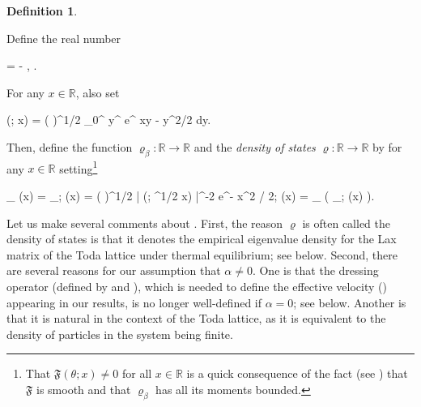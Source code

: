 \documentclass{amsart}
\numberwithin{equation}{section}
\theoremstyle{remark}
\theoremstyle{definition}
\newtheorem{definition}[thm]{Definition}
\begin{document}
	\begin{definition}
		
		\label{frho} 
		
		Define the real number
		\begin{flalign}
			\label{alpha} 
			\alpha =  \log \beta - \displaystyle{}, \qquad {}.
		\end{flalign} 

		\noindent For any $x \in \mathbb{R}$, also set   
		\begin{flalign*} 
			 (\theta; x) = \bigg( \displaystyle\frac{\theta}{\Gamma(\theta)} \bigg)^{1/2} \displaystyle\int_0^{\infty} y^{} e^{ xy - y^2/2} dy.
		\end{flalign*}
		
		\noindent Then, define the function $\varrho_{\beta} : \mathbb{R} \rightarrow \mathbb{R}$ and the \emph{density of states} $\varrho : \mathbb{R} \rightarrow \mathbb{R}$ by for any $x \in \mathbb{R}$ setting\footnote{That $\mathfrak{F}(\theta;x) \ne 0$ for all $x \in \mathbb{R}$ is a quick consequence of the fact (see \cite[Section 3.3]{SMRME}) that $\mathfrak{F}$ is smooth and that $\varrho_{\beta}$ has all its moments bounded.}
		\begin{flalign*}
			\varrho_{\beta} (x) = \varrho_{\beta; \theta} (x) = \Big( \displaystyle\frac{\beta}{2\pi} \Big)^{1/2} \cdot |  (\theta; \beta^{1/2} x) |^{-2} \cdot e^{- \beta x^2 / 2}; \qquad \varrho (x) = \partial_{\theta} \big( \theta \cdot \varrho_{\beta; \theta} (x) \big).
		\end{flalign*}
		
	\end{definition} 
	
	Let us make several comments about . First, the reason $\varrho$ is often called the density of states is that it denotes the empirical eigenvalue density for the Lax matrix of the Toda lattice under thermal equilibrium; see  below. Second, there are several reasons for our assumption that $\alpha \ne 0$. One is that the dressing operator (defined by  and ), which is needed to define the effective velocity () appearing in our results, is no longer well-defined if $\alpha = 0$; see  below. Another is that it is natural in the context of the Toda lattice, as it is equivalent to the density of particles in the system being finite. 
	
\end{document}
